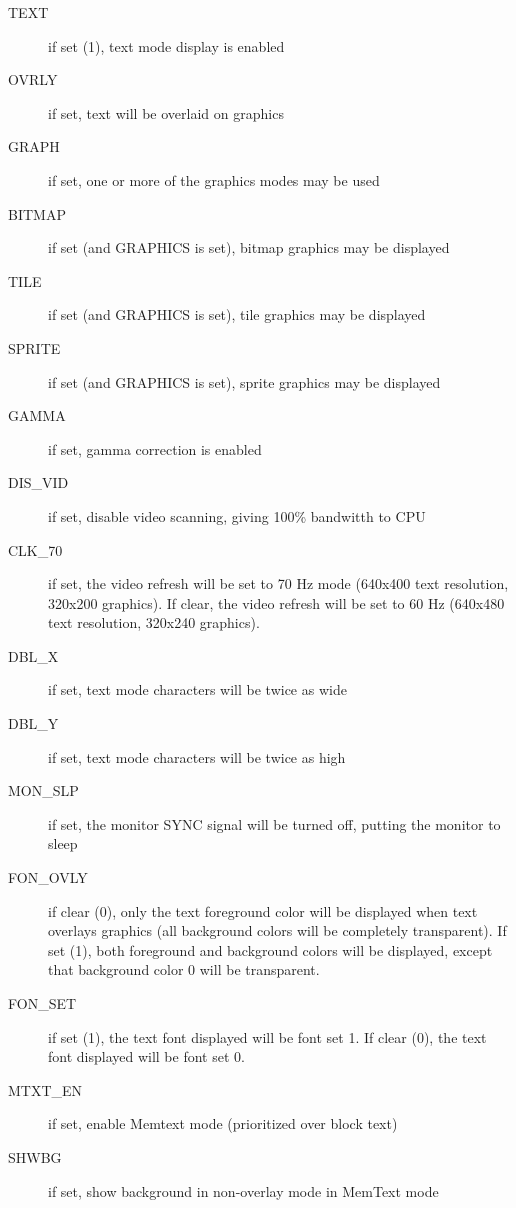 \begin{description}
    \item[TEXT] if set (1), text mode display is enabled

    \item[OVRLY] if set, text will be overlaid on graphics

    \item[GRAPH] if set, one or more of the graphics modes may be used

    \item[BITMAP] if set (and GRAPHICS is set), bitmap graphics may be displayed

    \item[TILE] if set (and GRAPHICS is set), tile graphics may be displayed

    \item[SPRITE] if set (and GRAPHICS is set), sprite graphics may be displayed

    \item[GAMMA] if set, gamma correction is enabled

    \item[DIS\_VID] if set, disable video scanning, giving 100\% bandwitth to CPU      

    \item[CLK\_70] if set, the video refresh will be set to 70 Hz mode (640x400 text resolution, 320x200 graphics). If clear,
        the video refresh will be set to 60 Hz (640x480 text resolution, 320x240 graphics).

    \item[DBL\_X] if set, text mode characters will be twice as wide

    \item[DBL\_Y] if set, text mode characters will be twice as high
    
    \item[MON\_SLP] if set, the monitor SYNC signal will be turned off, putting the monitor to sleep
    
    \item[FON\_OVLY] if clear (0), only the text foreground color will be displayed when text overlays graphics (all background colors will be completely transparent). If set (1), both foreground and background colors will be displayed, except that background color 0 will be transparent. 
    
    \item[FON\_SET] if set (1), the text font displayed will be font set 1. If clear (0), the text font displayed will be font set 0.

    \item[MTXT\_EN] if set, enable Memtext mode (prioritized over block text)

    \item[SHWBG] if set, show background in non-overlay mode in MemText mode      
\end{description}

